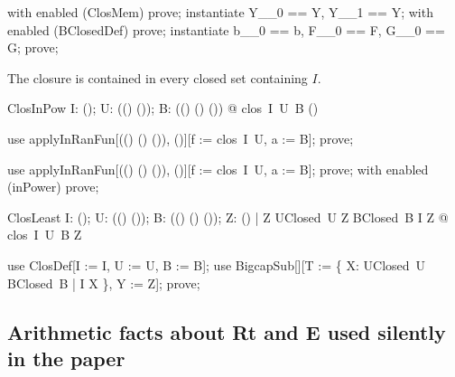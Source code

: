 \documentclass{article}
\begin{document}
\begin{zproof}
with enabled (ClosMem) prove;
instantiate Y\_\_0 == Y, Y\_\_1 == Y;
with enabled (BClosedDef) prove;
instantiate b\_\_0 == b, F\_\_0 == F, G\_\_0 == G;
prove;
\end{zproof}

The closure is contained in every closed set containing $I$.

\begin{theorem}{ClosInPow}
  \forall I: \power (\nat \fun \nat); U: \power ((\nat \fun \nat) \fun (\nat \fun \nat)); B: \power ((\nat \fun \nat) \cross (\nat \fun \nat) \fun (\nat \fun \nat)) @ clos~I~U~B \in \power (\nat \fun \nat)
\end{theorem}

\begin{zproof}
use applyInRanFun[\power ((\nat \fun \nat) \cross (\nat \fun \nat) \fun (\nat \fun \nat)), \power (\nat \fun \nat)][f := clos~I~U, a := B];
prove;
\end{zproof}


\begin{zproof}
use applyInRanFun[\power ((\nat \fun \nat) \cross (\nat \fun \nat) \fun (\nat \fun \nat)), \power (\nat \fun \nat)][f := clos~I~U, a := B];
prove;
with enabled (inPower) prove;
\end{zproof}

\begin{theorem}{ClosLeast}
  \forall I: \power (\nat \fun \nat); U: \power ((\nat \fun \nat) \fun (\nat \fun \nat)); B: \power ((\nat \fun \nat) \cross (\nat \fun \nat) \fun (\nat \fun \nat)); Z: \power (\nat \fun \nat) |
    Z \in UClosed~U \land Z \in BClosed~B \land I \subseteq Z @ clos~I~U~B \subseteq Z
\end{theorem}

\begin{zproof}
use ClosDef[I := I, U := U, B := B];
use BigcapSub[\nat \fun \nat][T := \{ X: UClosed~U \cap BClosed~B | I \subseteq X \}, Y := Z];
prove;
\end{zproof}

\subsection{Arithmetic facts about Rt and E used silently in the paper}
\end{document}

